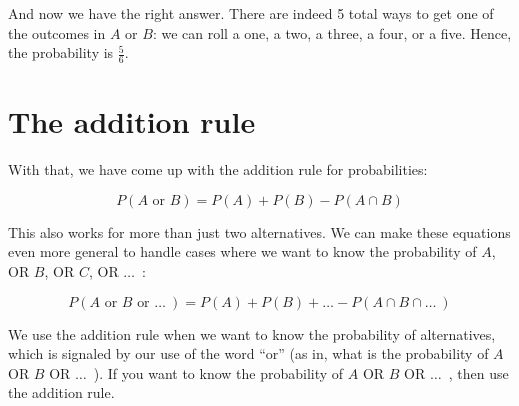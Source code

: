 \documentclass[../../../main.tex]{subfiles}
\begin{document}
\noindent
And now we have the right answer. There are indeed 5 total ways to get one of the outcomes in $A$ or $B$: we can roll a one, a two, a three, a four, or a five. Hence, the probability is $\frac{5}{6}$.


\section{The addition rule}

With that, we have come up with the addition rule for probabilities:

\begin{equation*}
  P(A \text{ or } B) = P(A) + P(B) - P(A \cap B)
\end{equation*}

\noindent
This also works for more than just two alternatives. We can make these equations even more general to handle cases where we want to know the probability of $A$, OR $B$, OR $C$, OR $\ldots$~:

\begin{equation*}
  P(A \text{ or } B \text{ or } \ldots~) = P(A) + P(B) + \ldots - P(A \cap B \cap \ldots~)
\end{equation*}

\noindent
We use the addition rule when we want to know the probability of alternatives, which is signaled by our use of the word ``or'' (as in, what is the probability of $A$ OR $B$ OR $\ldots$~). If you want to know the probability of $A$ OR $B$ OR $\ldots$~, then use the addition rule.
\end{document}
